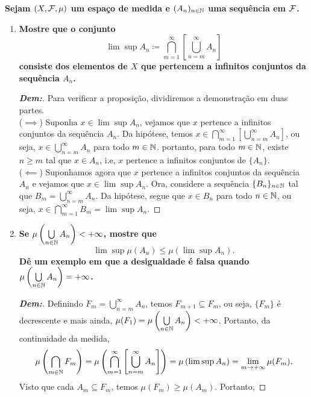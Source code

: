 \biglinend
\newpage 
{}
\myexe{\thedois}
\bigline 
\textbf{Sejam $(X, \mathcal F, \mu)$ um espaço de medida e $(A_n)_{n \in \mathbb N}$
uma sequência em $\mathcal F$.}
\begin{enumerate}[label=(\alph*), wide, labelindent=0pt]
  \item \textbf{Mostre que o conjunto 
    $$\lim \sup A_n \coloneq \bigcap_{m=1}^\infty\left
    [\bigcup\limits_{n = m}^\infty A_n\right]$$ 
    consiste dos elementos de $X$ que pertencem a infinitos conjuntos da sequência $A_n$.}
    \begin{proof}[\textbf{Dem:}] Para verificar a proposição, dividiremos a demonstração 
      em duas partes. \\
      ($\implies$) Suponha $x \in \lim\sup A_n$, vejamos que $x$ pertence a infinitos 
      conjuntos da sequência $A_n$. Da hipótese, temos $x \in \bigcap_{m=1}^\infty 
      \left[\bigcup_{n = m}^\infty A_n\right]$, ou seja, $x \in \bigcup_{n=m}^\infty A_n$
      para todo $m \in \mathbb N$. portanto, para todo $m \in \mathbb N$, existe $n \ge m$ tal que 
      $x \in A_n$, i.e, $x$ pertence a infinitos conjuntos de $\{A_n\}$.\\
      ($\impliedby$) Suponhamos agora que $x$ pertence a infinitos conjuntos da sequência 
      $A_n$ e vejamos que $x \in \lim\sup A_n$. Ora, considere a sequência 
      $\{B_n\}_{n \in \mathbb N}$ tal que $B_m = \bigcup_{n=m}^\infty A_n$. Da hipótese, 
      segue que $x \in B_n$ para todo $n \in \mathbb N$, ou seja, 
      $x \in \bigcap\limits_{m=1}^\infty B_m = \lim\sup A_n$. 
    \end{proof}
  \item \textbf{Se $\mu\left(\bigcup\limits_{n \in \mathbb N} A_n\right) < +\infty$, mostre que 
    $$\lim \sup \mu (A_n) \le \mu(\lim\sup A_n).$$
  Dê um exemplo em que a desigualdade é falsa quando $\mu\left(\bigcup
    \limits_{n \in \mathbb N} A_n\right) = +\infty$.}
    \begin{proof}[\textbf{Dem:}] Definindo $F_m = \bigcup\limits_{n = m}^\infty A_n$, temos 
      $F_{m + 1} \subseteq F_{m}$, ou seja, $\{F_m\}$ é decrescente e mais ainda, 
        $\mu(F_1) = \mu\left(\bigcup\limits_{n \in \mathbb N} A_n\right) < +\infty$. 
        Portanto, da continuidade da medida, 
        $$\mu\left(\bigcap_{m \in \mathbb N} F_m\right) =
        \mu\left(\bigcap_{m=1}^\infty\left[\bigcup\limits_{n = m}^\infty A_n\right]\right)
        = \mu\left(\lim\sup A_n\right) = \lim_{m \rightarrow +\infty} \mu(F_m).$$
      Visto que cada $A_m \subseteq F_m$, temos $\mu(F_m) \ge \mu(A_m)$. Portanto, 

\end{proof}
\end{enumerate}
